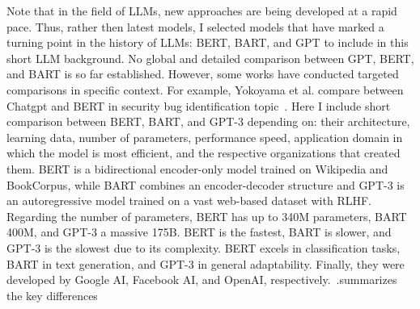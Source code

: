 Note that in the field of LLMs, new approaches are being developed at a rapid pace. Thus, rather then latest models, I selected models that have marked a turning point in the history of LLMs: BERT, BART, and GPT to include in this short LLM background. No global and detailed comparison between GPT, BERT, and BART is so far established. However, some works have conducted targeted comparisons in specific context. For example, Yokoyama et al. compare between Chatgpt and BERT in security bug identification topic~\cite{10685583}. Here I include short comparison  between BERT, BART, and GPT-3 depending on: their architecture, learning data, number of parameters, performance speed, application domain in which the model is most efficient, and the respective organizations that created them. BERT is a bidirectional encoder-only model trained on Wikipedia and BookCorpus, while BART combines an encoder-decoder structure and GPT-3 is an autoregressive model trained on a vast web-based dataset with RLHF. Regarding the number of parameters, BERT has up to 340M parameters, BART 400M, and GPT-3 a massive 175B. BERT is the fastest, BART is slower, and GPT-3 is the slowest due to its complexity. BERT excels in classification tasks, BART in text generation, and GPT-3 in general adaptability. Finally, they were developed by Google AI, Facebook AI, and OpenAI, respectively.~\cite{DBLP:journals/corr/abs-2302-09419,lewis2019bartdenoisingsequencetosequencepretraining}.summarizes the key differences
	
		
